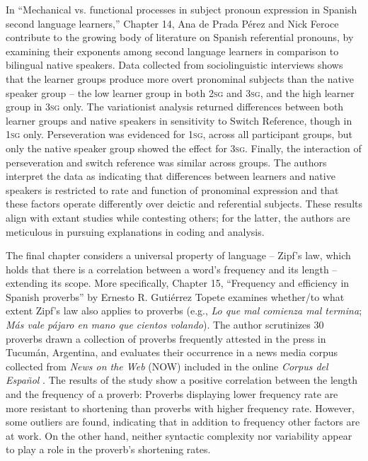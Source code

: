 \documentclass[output=paper,draftmode]{langscibook}
\begin{document}
In “Mechanical vs. functional processes in subject pronoun expression in Spanish second language learners,” Chapter 14, Ana de Prada Pérez and Nick Feroce contribute to the growing body of literature on Spanish referential pronouns, by examining their exponents among second language learners in comparison to bilingual native speakers. Data collected from sociolinguistic interviews shows that the learner groups produce more overt pronominal subjects than the native speaker group -- the low learner group in both 2\textsc{sg} and 3\textsc{sg}, and the high learner group in 3\textsc{sg} only. The variationist analysis returned differences between both learner groups and native speakers in sensitivity to Switch Reference, though in 1\textsc{sg} only. Perseveration was evidenced for 1\textsc{sg}, across all participant groups, but only the native speaker group showed the effect for 3\textsc{sg}. Finally, the interaction of perseveration and switch reference was similar across groups. The authors interpret the data as indicating that differences between learners and native speakers is restricted to rate and function of pronominal expression and that these factors operate differently over deictic and referential subjects. These results align with extant studies while contesting others; for the latter, the authors are meticulous in pursuing explanations in coding and analysis.


The final chapter considers a universal property of language -- Zipf’s law, which holds that there is a correlation between a word’s frequency and its length -- extending its scope. More specifically, Chapter 15, “Frequency and efficiency in Spanish proverbs” by Ernesto R. Gutiérrez Topete examines whether/to what extent Zipf’s law also applies to proverbs (e.g., \textit{Lo que mal comienza mal termina}; \textit{Más vale pájaro en mano que cientos volando}). The author scrutinizes 30 proverbs drawn a collection of proverbs frequently attested in the press in Tucumán, Argentina, and evaluates their occurrence in a news media corpus collected from \textit{News on the Web} (NOW) included in the online \textit{Corpus del Español} \citep{Davies}. The results of the study show a positive correlation between the length and the frequency of a proverb: Proverbs displaying lower frequency rate are more resistant to shortening than proverbs with higher frequency rate. However, some outliers are found, indicating that in addition to frequency other factors are at work. On the other hand, neither syntactic complexity nor variability appear to play a role in the proverb’s shortening rates.
\end{document}
